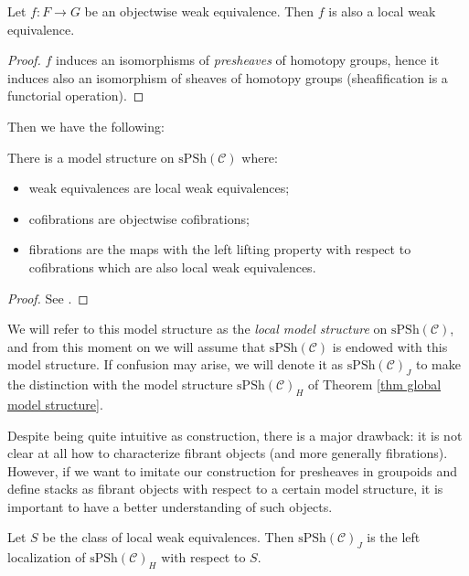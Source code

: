 \begin{refsection}
\begin{lemma} \label{lemma objectwise w.e. are local}
Let $f \colon F \to G$ be an objectwise weak equivalence. Then $f$ is also a local weak equivalence.
\end{lemma}

\begin{proof}
$f$ induces an isomorphisms of \emph{presheaves} of homotopy groups, hence it induces also an isomorphism of sheaves of homotopy groups (sheafification is a functorial operation).
\end{proof}

Then we have the following:

\begin{thm} \label{thm local model structure}
There is a model structure on $\mathrm{sPSh}(\mathcal C)$ where:
\begin{itemize}
\item weak equivalences are local weak equivalences;
\item cofibrations are objectwise cofibrations;
\item fibrations are the maps with the left lifting property with respect to cofibrations which are also local weak equivalences.
\end{itemize}
\end{thm}

\begin{proof}
See \cite[Thm. 2.3]{jardinepresheaves}.
\end{proof}

We will refer to this model structure as the \emph{local model structure} on $\mathrm{sPSh}(\mathcal C)$, and from this moment on we will assume that $\mathrm{sPSh}(\mathcal C)$ is endowed with this model structure. If confusion may arise, we will denote it as $\mathrm{sPSh}(\mathcal C)_J$ to make the distinction with the model structure $\mathrm{sPSh}(\mathcal C)_H$ of Theorem \ref{thm global model structure}.

Despite being quite intuitive as construction, there is a major drawback: it is not clear at all how to characterize fibrant objects (and more generally fibrations). However, if we want to imitate our construction for presheaves in groupoids and define stacks as fibrant objects with respect to a certain model structure, it is important to have a better understanding of such objects.

\begin{cor}
Let $S$ be the class of local weak equivalences. Then $\mathrm{sPSh}(\mathcal C)_J$ is the left localization of $\mathrm{sPSh}(\mathcal C)_H$ with respect to $S$.
\end{cor}


\end{refsection}
